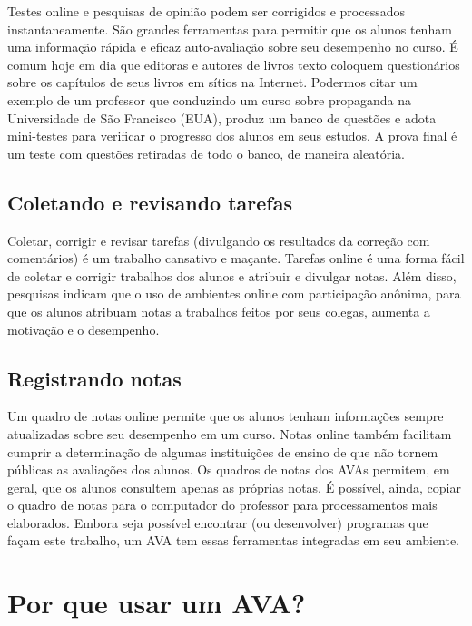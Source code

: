 
Testes online e pesquisas de opinião podem ser corrigidos e processados instantaneamente. São grandes ferramentas para permitir que os alunos tenham uma informação rápida e eficaz auto-avaliação sobre seu desempenho no curso. É comum hoje em dia que editoras e autores de livros texto coloquem questionários sobre os capítulos de seus livros em sítios na Internet. Podermos citar um exemplo de um professor que conduzindo um curso sobre propaganda na Universidade de São Francisco (EUA), produz um banco de questões e adota mini-testes para verificar o progresso dos alunos em seus estudos. A prova final é um teste com questões retiradas de todo o banco, de maneira aleatória.

\subsection{Coletando e revisando tarefas}


Coletar, corrigir e revisar tarefas (divulgando os resultados da correção com comentários) é um trabalho cansativo e maçante. Tarefas online é uma forma fácil de coletar e corrigir trabalhos dos alunos e atribuir e divulgar notas. Além disso, pesquisas indicam que o uso de ambientes online com participação anônima, para que os alunos atribuam notas a trabalhos feitos por seus colegas, aumenta a motivação e o desempenho.

\subsection{Registrando notas}


Um quadro de notas online permite que os alunos tenham informações sempre atualizadas sobre seu desempenho em um curso. Notas online também facilitam cumprir a determinação de algumas instituições de ensino de que não tornem públicas as avaliações dos alunos. Os quadros de notas dos AVAs permitem, em geral, que os alunos consultem apenas as próprias notas. É possível, ainda, copiar o quadro de notas para o computador do professor para processamentos mais elaborados. Embora seja possível encontrar (ou desenvolver) programas que façam este trabalho, um AVA tem essas ferramentas integradas em seu ambiente. 

\section{Por que usar um AVA?}

